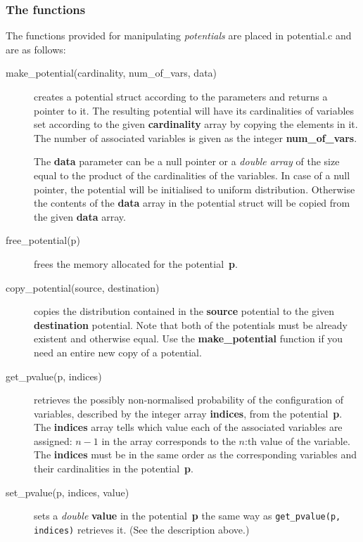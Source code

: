 \documentclass[12pt,a4paper]{report}
\begin{document}
\subsubsection{The functions}
The functions provided for manipulating {\it potentials} are placed in
potential.c and are as follows:
\begin{description}
\item[make\_potential(cardinality, num\_of\_vars, data)] creates a
potential struct according to the parameters and returns a pointer
to it. The resulting potential will have its cardinalities of
variables set according to the given \textbf{cardinality} array by
copying the elements in it. The number of associated variables is
given as the integer \textbf{num\_of\_vars}. 

The \textbf{data} parameter can be a null pointer or a {\it double 
array} of the size equal to the product of the cardinalities of the 
variables. In case of a null pointer, the potential will be
initialised to uniform distribution. Otherwise the contents of 
the \textbf{data} array in the potential struct will be copied from
the given \textbf{data} array.

\item[free\_potential(p)] frees the memory allocated for the
potential~\textbf{p}. 

\item[copy\_potential(source, destination)] copies the distribution
contained in the \textbf{source} potential to the given
\textbf{destination} potential. Note that both of the potentials must
be already existent and otherwise equal. Use the 
\textbf{make\_potential} function if you need an entire new copy of 
a potential.

\item[get\_pvalue(p, indices)] retrieves the possibly non-normalised
probability of the configuration of variables, described by the integer 
array \textbf{indices}, from the potential~\textbf{p}. The
\textbf{indices} array tells which value each of the associated
variables are assigned: $n-1$ in the array corresponds to the $n$:th 
value of the variable. The \textbf{indices} must be in the same order
as the corresponding variables and their cardinalities in the
potential~\textbf{p}. 

\item[set\_pvalue(p, indices, value)] sets a {\it double}
\textbf{value} in the potential~\textbf{p} the same way as 
\verb+get_pvalue(p, indices)+ retrieves it. (See the description above.)


\end{description}
\end{document}
